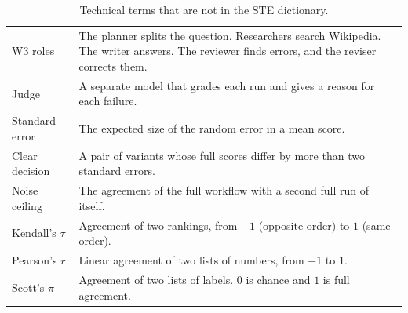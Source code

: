 \begin{table}[t]
\begin{tabular}{@{}p{17mm}p{54.5mm}@{}}
W3 roles & The planner splits the question. Researchers search Wikipedia. The writer answers. The reviewer finds errors, and the reviser corrects them. \\
Judge & A separate model that grades each run and gives a reason for each failure. \\
Standard error & The expected size of the random error in a mean score. \\
Clear decision & A pair of variants whose full scores differ by more than two standard errors. \\
Noise ceiling & The agreement of the full workflow with a second full run of itself. \\
Kendall's $\tau$ & Agreement of two rankings, from $-1$ (opposite order) to $1$ (same order). \\
Pearson's $r$ & Linear agreement of two lists of numbers, from $-1$ to $1$. \\
Scott's $\pi$ & Agreement of two lists of labels. $0$ is chance and $1$ is full agreement. \\
\bottomrule
\end{tabular}
\caption{Technical terms that are not in the STE dictionary.}
\label{tab:terms}
\end{table}
